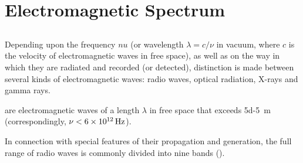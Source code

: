 \section{Electromagnetic Spectrum}
\label{sec-31.4} 


\subsection{}\label{31.4.1} Depending upon the frequency $nu$ (or wavelength $\lambda = c/\nu$ in vacuum, where $c$ is the velocity of electromagnetic waves in free space), as well as on the way in which they are radiated and recorded (or detected), distinction is made between several kinds of electromagnetic waves: radio waves, optical radiation, X-rays and gamma rays.

 are electromagnetic waves of a length $\lambda$ in free space that exceeds \SI{5d-5}{\meter} (correspondingly, $\nu < \SI{6d12}{\hertz}$).

In connection with special features of their propagation and
generation, the full range of radio waves is commonly divided
into nine bands ().


